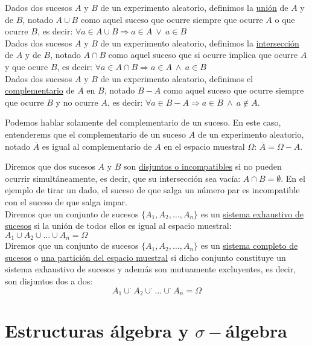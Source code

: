 Dados dos sucesos $A$ y $B$ de un experimento aleatorio, definimos la \underline{unión} de $A$ y de $B$,
notado $A \cup B$ como aquel suceso que ocurre siempre que ocurre $A$ o que ocurre $B$, es decir:
$\forall a \in A \cup B \Rightarrow a \in A \ \lor \ a \in B $\\


Dados dos sucesos $A$ y $B$ de un experimento aleatorio, definimos la \underline{intersección} de $A$ y
de $B$, notado $A \cap B$ como aquel suceso que si ocurre implica que ocurre $A$ y que ocure $B$, es decir:
$\forall a \in A \cap B \Rightarrow a \in A \ \land \ a \in B $\\


Dados dos sucesos $A$ y $B$ de un experimento aleatorio, definimos el \underline{complementario} de $A$
en $B$, notado $B-A$ como aquel suceso que ocurre siempre que ocurre $B$ y no ocurre $A$, es decir:
$\forall a \in B - A \Rightarrow a \in B \ \land \ a \notin A$.


Podemos hablar solamente del complementario de un suceso. En este caso, entenderems que el complementario
de un suceso $A$ de un experimento aleatorio, notado $\overline{A}$ es igual al complementario de $A$
en el espacio muestral $\Omega$: $\overline{A} = \Omega - A$.\\

\bigskip


Diremos que dos sucesos $A$ y $B$ son \underline{disjuntos o incompatibles} si no pueden ocurrir
simultáneamente, es decir, que su intersección sea vacía: $A \cap B = \emptyset$. En el ejemplo de
tirar un dado, el suceso de que salga un número par es incompatible con el suceso de que salga impar.\\


Diremos que un conjunto de sucesos $\{A_1, A_2, \ldots, A_n\}$ es un \newline \underline{sistema exhaustivo
  de sucesos} si la unión de todos ellos es igual al espacio muestral:
$A_1 \cup A_2 \cup \ldots \cup A_n = \Omega$ \\


Diremos que un conjunto de sucesos $\{A_1, A_2, \ldots, A_n\}$ es un \underline{sistema completo de sucesos} o \underline{una partición del espacio muestral} si dicho conjunto constituye un sistema exhaustivo
de sucesos y además son mutuamente excluyentes, es decir, son disjuntos dos a dos:
$$A_1 \mathop{\cup}^{\cdot} A_2 \mathop{\cup}^{\cdot} \ldots \mathop{\cup}^{\cdot} A_n = \Omega$$

\section{Estructuras álgebra y $\sigma-$álgebra}


